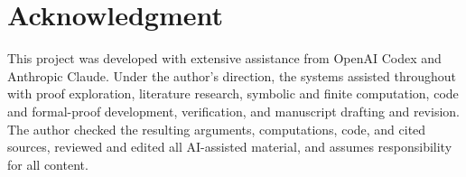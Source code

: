 \section*{Acknowledgment}

This project was developed with extensive assistance from OpenAI Codex and
Anthropic Claude. Under the author's direction, the systems assisted
throughout with proof exploration, literature research, symbolic and finite
computation, code and formal-proof development, verification, and manuscript
drafting and revision. The author checked the resulting arguments,
computations, code, and cited sources, reviewed and edited all AI-assisted
material, and assumes responsibility for all content.
